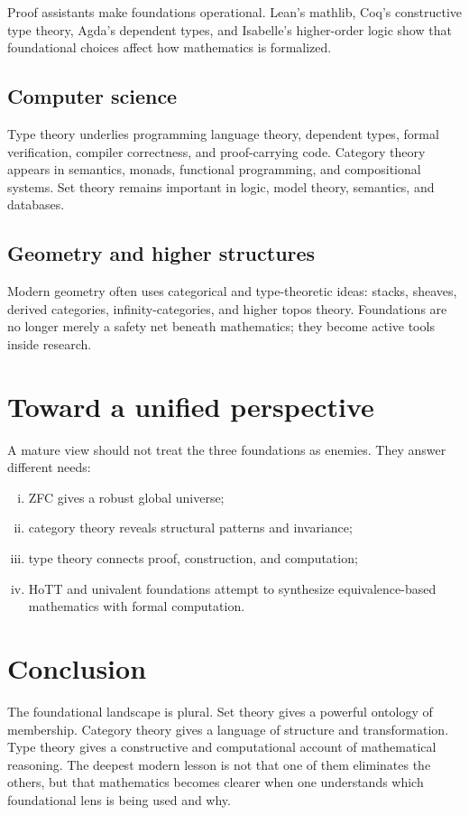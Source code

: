 Proof assistants make foundations operational.  Lean's mathlib, Coq's constructive type theory, Agda's dependent types, and Isabelle's higher-order logic show that foundational choices affect how mathematics is formalized.

\subsection{Computer science}

Type theory underlies programming language theory, dependent types, formal verification, compiler correctness, and proof-carrying code.  Category theory appears in semantics, monads, functional programming, and compositional systems.  Set theory remains important in logic, model theory, semantics, and databases.

\subsection{Geometry and higher structures}

Modern geometry often uses categorical and type-theoretic ideas: stacks, sheaves, derived categories, infinity-categories, and higher topos theory.  Foundations are no longer merely a safety net beneath mathematics; they become active tools inside research.

\section{Toward a unified perspective}

A mature view should not treat the three foundations as enemies.  They answer different needs:
\begin{enumerate}[(i)]
  \item ZFC gives a robust global universe;
  \item category theory reveals structural patterns and invariance;
  \item type theory connects proof, construction, and computation;
  \item HoTT and univalent foundations attempt to synthesize equivalence-based mathematics with formal computation.
\end{enumerate}

\section{Conclusion}

The foundational landscape is plural.  Set theory gives a powerful ontology of membership.  Category theory gives a language of structure and transformation.  Type theory gives a constructive and computational account of mathematical reasoning.  The deepest modern lesson is not that one of them eliminates the others, but that mathematics becomes clearer when one understands which foundational lens is being used and why.


